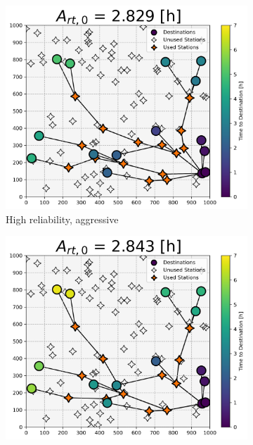 \documentclass[11pt]{article}
\begin{document}
\begin{multicols}{2}
\begin{figure}[H]
	\centering
	\begin{subfigure}[t]{.5\linewidth}
		\centering\captionsetup{width = .8\linewidth}
		\includegraphics[width = \linewidth]{figs/random_example_high_reliability_aggressive_n.png}
		\caption{High reliability, aggressive}
	\end{subfigure}%
	\begin{subfigure}[t]{.5\linewidth}
		\centering\captionsetup{width = .8\linewidth}
		\includegraphics[width = \linewidth]{figs/random_example_high_reliability_cautious_n.png}

\end{subfigure}
\end{figure}
\end{multicols}
\end{document}
